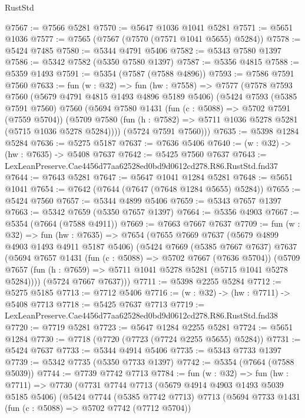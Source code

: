 \begin{lexlean}{RustStd}
\begin{coremodule}
@7567 := @7566 @5281
@7570 := @5647 @1036 @1041 @5281
@7571 := @5651 @1036
@7577 := @7565 (@7567 (@7570 (@7571 @1041 @5655) @5284))
@7578 := @5424 @7485
@7580 := @5344 @4791 @5406
@7582 := @5343 @7580 @1397
@7586 := @5342 @7582 (@5350 @7580 @1397)
@7587 := @5356 @4815
@7588 := @5359 @1493
@7591 := @5354 (@7587 (@7588 @4896))
@7593 := @7586 @7591 @7560
@7633 := fun (w : @32) =>
  fun (hw : @7558) =>
  @7577
    (@7578
      @7593
      @7560
      (@5679 @4791 @4815 @1493 @4896 @5189 @5406)
      (@5424
        @7593
        (@5385 @7591 @7560)
        @7560
        (@5694
          @7580
          @1431
          (fun (c : @5088) => @5702 @7591 (@7559 @5704))
          (@5709 @7580 (fun (h : @7582) => @5711 @1036 @5278 @5281 (@5715 @1036 @5278 @5284))))
        (@5724 @7591 @7560)))
@7635 := @5398 @1284 @5284
@7636 := @5275 @5187
@7637 := @7636 @5406
@7640 := (w : @32) -> (hw : @7635) -> @5408 @7637
@7642 := @5425 @7560 @7637
@7643 := LexLeanPreserve.Cae4456d77aa62528ed0bd9d0612cd278.R86.RustStd.fnd37
@7644 := @7643 @5281
@7647 := @5647 @1041 @1284 @5281
@7648 := @5651 @1041
@7654 := @7642 (@7644 (@7647 (@7648 @1284 @5655) @5284))
@7655 := @5424 @7560
@7657 := @5344 @4899 @5406
@7659 := @5343 @7657 @1397
@7663 := @5342 @7659 (@5350 @7657 @1397)
@7664 := @5356 @4903
@7667 := @5354 (@7664 (@7588 @4911))
@7669 := @7663 @7667 @7637
@7709 := fun (w : @32) =>
  fun (hw : @7635) =>
  @7654
    (@7655
      @7669
      @7637
      (@5679 @4899 @4903 @1493 @4911 @5187 @5406)
      (@5424
        @7669
        (@5385 @7667 @7637)
        @7637
        (@5694
          @7657
          @1431
          (fun (c : @5088) => @5702 @7667 (@7636 @5704))
          (@5709 @7657 (fun (h : @7659) => @5711 @1041 @5278 @5281 (@5715 @1041 @5278 @5284))))
        (@5724 @7667 @7637)))
@7711 := @5398 @2255 @5284
@7712 := @5275 @5185
@7713 := @7712 @5406
@7716 := (w : @32) -> (hw : @7711) -> @5408 @7713
@7718 := @5425 @7637 @7713
@7719 := LexLeanPreserve.Cae4456d77aa62528ed0bd9d0612cd278.R86.RustStd.fnd38
@7720 := @7719 @5281
@7723 := @5647 @1284 @2255 @5281
@7724 := @5651 @1284
@7730 := @7718 (@7720 (@7723 (@7724 @2255 @5655) @5284))
@7731 := @5424 @7637
@7733 := @5344 @4914 @5406
@7735 := @5343 @7733 @1397
@7739 := @5342 @7735 (@5350 @7733 @1397)
@7742 := @5354 (@7664 (@7588 @5039))
@7744 := @7739 @7742 @7713
@7784 := fun (w : @32) =>
  fun (hw : @7711) =>
  @7730
    (@7731
      @7744
      @7713
      (@5679 @4914 @4903 @1493 @5039 @5185 @5406)
      (@5424
        @7744
        (@5385 @7742 @7713)
        @7713
        (@5694
          @7733
          @1431
          (fun (c : @5088) => @5702 @7742 (@7712 @5704))

\end{coremodule}
\end{lexlean}
